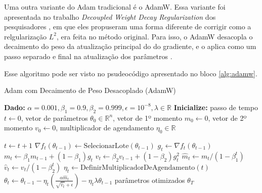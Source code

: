 Uma outra variante do Adam tradicional é o AdamW. Essa variante foi apresentada no trabalho \textit{Decoupled Weight Decay Regularization} dos pesquisadores \textcite{AdamWMethod}, em que eles propuseram uma forma diferente de corrigir como a relgularização $L^2$, era feita no método original. Para isso, o AdamW desacopla o decaimento do peso da atualização principal do do gradiente, e o aplica como um passo separado e final na atualização dos parâmetros \parencite{AdamWMethod}.

Esse algoritmo pode ser visto no psudeocódigo apresentado no bloco \ref{alg:adamw}.

\begin{algorithm}[H]
    \caption{Adam com Decaimento de Peso Desacoplado (AdamW)}
    \label{alg:adamw}
    \begin{algorithmic}[1]

    \State \textbf{Dado:} $\alpha=0.001, \beta_1=0.9, \beta_2=0.999, \epsilon=10^{-8}, \lambda \in \mathbb{R}$
    \State \textbf{Inicialize:} passo de tempo $t \leftarrow 0$, vetor de parâmetros $\theta_0 \in \mathbb{R}^n$, vetor de 1º momento $m_0 \leftarrow 0$, vetor de 2º momento $v_0 \leftarrow 0$, multiplicador de agendamento $\eta_0 \in \mathbb{R}$

    \Repeat
        \State $t \leftarrow t + 1$
        \State $\nabla f_t(\theta_{t-1}) \leftarrow \text{SelecionarLote}(\theta_{t-1})$ 
        \State $g_t \leftarrow \nabla f_t(\theta_{t-1})$ 
        \State $m_t \leftarrow \beta_1 m_{t-1} + (1 - \beta_1) g_t$ 
        \State $v_t \leftarrow \beta_2 v_{t-1} + (1 - \beta_2) g_t^2$ 
        \State $\hat{m}_t \leftarrow m_t / (1 - \beta_1^t)$ 
        \State $\hat{v}_t \leftarrow v_t / (1 - \beta_2^t)$ 
        \State $\eta_t \leftarrow \text{DefinirMultiplicadorDeAgendamento}(t)$ 
        \State $\theta_t \leftarrow \theta_{t-1} - \eta_t \left( \frac{\alpha \hat{m}_t}{\sqrt{\hat{v}_t} + \epsilon} \right) - \eta_t \lambda \theta_{t-1}$ 
    \State \Return parâmetros otimizados $\theta_T$
    \end{algorithmic}
\end{algorithm}

